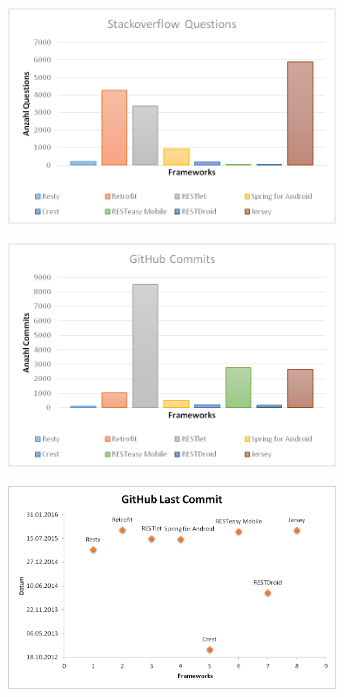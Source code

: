 \begin{minipage}{\textwidth} 
	\centering	
	\includegraphics[width=0.65\textwidth]{figures/stackoverflow_questions.png}
	\label{figure:stackoverflowQuestions}
	\vspace{2ex}
\end{minipage}

\begin{minipage}{\textwidth} 
	\centering	
	\includegraphics[width=0.65\textwidth]{figures/github_commits.png}
	\label{figure:githubCommits}
	\vspace{2ex}
\end{minipage}

\begin{minipage}{\textwidth} 
	\centering	
	\includegraphics[width=0.65\textwidth]{figures/github_lastCommit.png}
	\label{figure:githubLastCommit}
	\vspace{5ex}
\end{minipage}

